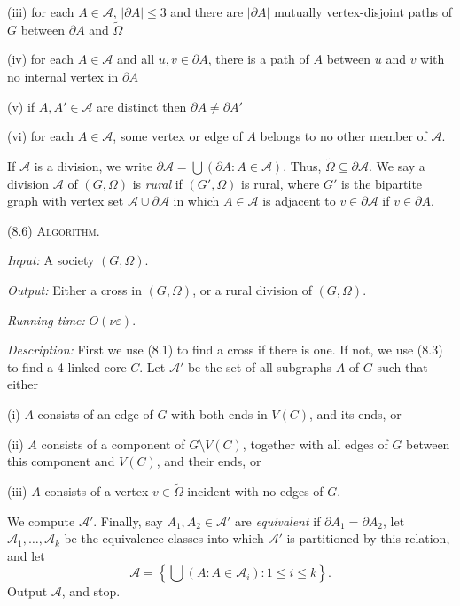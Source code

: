 \hspace*{12pt}(iii) for each $A \in \mathcal{A}$, $|\partial A| \le 3$ and there are $|\partial A|$ mutually vertex-disjoint paths of $G$ between $\partial A$ and $\tilde{\Omega}$

\hspace*{12pt}(iv) for each $A \in \mathcal{A}$ and all $u, v \in \partial A$, there is a path of $A$ between $u$ and $v$ with no internal vertex in $\partial A$

\hspace*{12pt}(v) if $A, A' \in \mathcal{A}$ are distinct then $\partial A \ne \partial A'$

\hspace*{12pt}(vi) for each $A \in \mathcal{A}$, some vertex or edge of $A$ belongs to no other member of $\mathcal{A}$.

If $\mathcal{A}$ is a division, we write $\partial\mathcal{A} = \bigcup(\partial A : A \in \mathcal{A})$. Thus, $\tilde{\Omega} \subseteq \partial\mathcal{A}$. We say a division $\mathcal{A}$ of $(G, \Omega)$ is \textit{rural} if $(G', \Omega)$ is rural, where $G'$ is the bipartite graph with vertex set $\mathcal{A} \cup \partial\mathcal{A}$ in which $A \in \mathcal{A}$ is adjacent to $v \in \partial\mathcal{A}$ if $v \in \partial A$.

\stmt
(8.6) \textsc{Algorithm}.

\textit{Input:} A society $(G, \Omega)$.

\textit{Output:} Either a cross in $(G, \Omega)$, or a rural division of $(G, \Omega)$.

\textit{Running time:} $O(\nu\varepsilon)$.

\textit{Description:} First we use (8.1) to find a cross if there is one. If not, we use (8.3) to find a 4-linked core $C$. Let $\mathcal{A}'$ be the set of all subgraphs $A$ of $G$ such that either

\hspace*{12pt}(i) $A$ consists of an edge of $G$ with both ends in $V(C)$, and its ends, or

\hspace*{12pt}(ii) $A$ consists of a component of $G \setminus V(C)$, together with all edges of $G$ between this component and $V(C)$, and their ends, or

\hspace*{12pt}(iii) $A$ consists of a vertex $v \in \tilde{\Omega}$ incident with no edges of $G$.

We compute $\mathcal{A}'$. Finally, say $A_1, A_2 \in \mathcal{A}'$ are \textit{equivalent} if $\partial A_1 = \partial A_2$, let $\mathcal{A}_1, \dots, \mathcal{A}_k$ be the equivalence classes into which $\mathcal{A}'$ is partitioned by this relation, and let
\begin{equation*}
\mathcal{A} = \left\{ \bigcup(A : A \in \mathcal{A}_i) : 1 \le i \le k \right\}.
\end{equation*}
Output $\mathcal{A}$, and stop.

